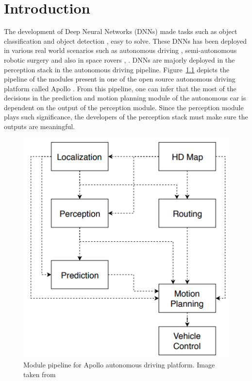 

    \chapter{Introduction}

The development of Deep Neural Networks (DNNs) made tasks such as object classification \cite{alexnet} and object detection \cite{fasterrcnn}, \cite{fastrcnn} easy to solve.
These DNNs has been deployed in various real world scenarios such as autonomous driving \cite{autonomousdriving}, semi-autonomous robotic surgery \cite{roboticsurgery} and also in space rovers \cite{Marsrover_1}, \cite{Marsrover_2}.
DNNs are majorly deployed in the perception stack in the autonomous driving pipeline. 
Figure~\ref{fig:Apollopipeline} depicts the pipeline of the modules present in one of the open source autonomous driving platform called Apollo \cite{baiduapollo}.
From this pipeline, one can infer that the most of the decisions in the prediction and motion planning module of the autonomous car is dependent on the output of the perception module.
Since the perception module plays such significance, the developers of the perception stack must make sure the outputs are meaningful.
\begin{figure}[h!]
    \centering
    \includegraphics[scale=0.35]{images/Apollopipeline.png}
    \caption{Module pipeline for Apollo autonomous driving platform. Image taken from \cite{baiduapollo}}
    \label{fig:Apollopipeline}
\end{figure}

